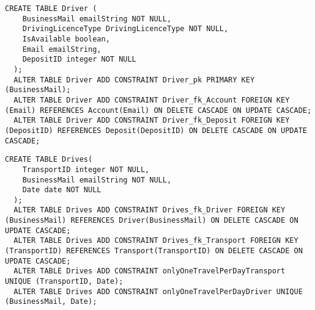 \begin{lstlisting}[caption={Creazione della tabella \textbf{Driver}}]
  CREATE TABLE Driver (
    BusinessMail emailString NOT NULL,
    DrivingLicenceType DrivingLicenceType NOT NULL,
    IsAvailable boolean,
    Email emailString, 
    DepositID integer NOT NULL 
  );
  ALTER TABLE Driver ADD CONSTRAINT Driver_pk PRIMARY KEY (BusinessMail);
  ALTER TABLE Driver ADD CONSTRAINT Driver_fk_Account FOREIGN KEY (Email) REFERENCES Account(Email) ON DELETE CASCADE ON UPDATE CASCADE;
  ALTER TABLE Driver ADD CONSTRAINT Driver_fk_Deposit FOREIGN KEY (DepositID) REFERENCES Deposit(DepositID) ON DELETE CASCADE ON UPDATE CASCADE;
\end{lstlisting}

\newpage

\begin{lstlisting}[caption={Creazione della tabella \textbf{Drives}}]
  CREATE TABLE Drives(
    TransportID integer NOT NULL,
    BusinessMail emailString NOT NULL,
    Date date NOT NULL
  );
  ALTER TABLE Drives ADD CONSTRAINT Drives_fk_Driver FOREIGN KEY (BusinessMail) REFERENCES Driver(BusinessMail) ON DELETE CASCADE ON UPDATE CASCADE;
  ALTER TABLE Drives ADD CONSTRAINT Drives_fk_Transport FOREIGN KEY (TransportID) REFERENCES Transport(TransportID) ON DELETE CASCADE ON UPDATE CASCADE;
  ALTER TABLE Drives ADD CONSTRAINT onlyOneTravelPerDayTransport UNIQUE (TransportID, Date);
  ALTER TABLE Drives ADD CONSTRAINT onlyOneTravelPerDayDriver UNIQUE (BusinessMail, Date);
\end{lstlisting}
